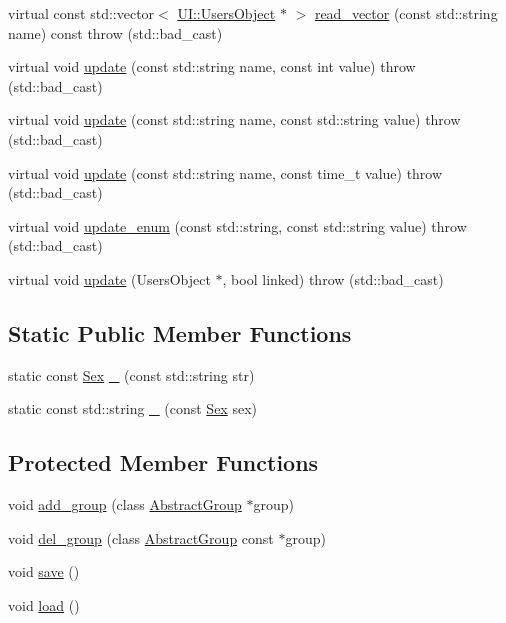 \begin{DoxyCompactItemize}
\item 
virtual const std::vector$<$ \hyperlink{classUI_1_1UsersObject}{UI::UsersObject} $\ast$ $>$ \hyperlink{classCore_1_1Person_ab28c3e468d265c16bce1d4488493c5a6}{read\_\-vector} (const std::string name) const   throw (std::bad\_\-cast)
\item 
virtual void \hyperlink{classCore_1_1Person_ac2900dc24258c00ea1de17350c3f4658}{update} (const std::string name, const int value)  throw (std::bad\_\-cast)
\item 
virtual void \hyperlink{classCore_1_1Person_a51ec02307587cf9dfd7ed3036cf202cd}{update} (const std::string name, const std::string value)  throw (std::bad\_\-cast)
\item 
virtual void \hyperlink{classCore_1_1Person_ad650eba89f671041c26f8d1419f6e6c8}{update} (const std::string name, const time\_\-t value)  throw (std::bad\_\-cast)
\item 
virtual void \hyperlink{classCore_1_1Person_a1c6826659c2413189dae536f7c83af98}{update\_\-enum} (const std::string, const std::string value)  throw (std::bad\_\-cast)
\item 
virtual void \hyperlink{classCore_1_1Person_a50fa1e127f56e2caa873017b54c090cb}{update} (UsersObject $\ast$, bool linked)  throw (std::bad\_\-cast)
\end{DoxyCompactItemize}
\subsection*{Static Public Member Functions}
\begin{DoxyCompactItemize}
\item 
static const \hyperlink{classCore_1_1Person_a01e6eee93727f9ce06525eca689b4764}{Sex} \hyperlink{classCore_1_1Person_a88e1d40e7be7d95e6cec9bc623d6e076}{\_\-} (const std::string str)
\item 
static const std::string \hyperlink{classCore_1_1Person_a7ded3b871b2e7f6ce35b7b1f4e1738ee}{\_\-} (const \hyperlink{classCore_1_1Person_a01e6eee93727f9ce06525eca689b4764}{Sex} sex)
\end{DoxyCompactItemize}
\subsection*{Protected Member Functions}
\begin{DoxyCompactItemize}
\item 
void \hyperlink{classCore_1_1Person_aa9b9581966365e7272d43e77f7a220e4}{add\_\-group} (class \hyperlink{classCore_1_1AbstractGroup}{AbstractGroup} $\ast$group)
\item 
void \hyperlink{classCore_1_1Person_a0057f7bd335dd35e470e67ad2e22b0d5}{del\_\-group} (class \hyperlink{classCore_1_1AbstractGroup}{AbstractGroup} const $\ast$group)
\item 
void \hyperlink{classCore_1_1Person_a846fa55a79f6da0258d711adc88a1a30}{save} ()
\item 
void \hyperlink{classCore_1_1Person_ae88c1b9c89b03ac7f4ba3ddcff4c62a7}{load} ()
\end{DoxyCompactItemize}
